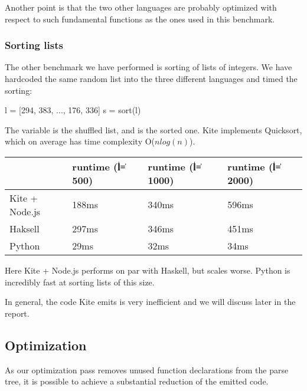 Another point is that the two other languages are probably optimized with respect to such fundamental functions as the ones used in this benchmark.

\subsubsection{Sorting lists}

The other benchmark we have performed is sorting of lists of integers. We have hardcoded the same random list into the three different languages and timed the sorting:

\begin{kite}

l = [294, 383, ..., 176, 336]
s = sort(l)
\end{kite}

The variable  is the shuffled list, and  is the sorted one. Kite implements Quicksort, which on average has time complexity O($n log(n)$).

  \begin{table}[h]
    \centering
    \begin{tabular}{|l|l|l|l|}
      \hline 
      & runtime (\|l\| = 500) & runtime (\|l\| = 1000) & runtime (\|l\| = 2000) \\

      \hline 
      Kite + Node.js & 188ms            & 340ms           & 596ms                  \\
      Haksell        & 297ms            & 346ms             & 451ms                \\
      Python         & 29ms             & 32ms             & 34ms                  \\
      \hline 
    \end{tabular}
  \end{table}

Here Kite + Node.js performs on par with Haskell, but scales worse. Python is incredibly fast at sorting lists of this size.

In general, the code Kite emits is very inefficient and we will discuss later in the report.


\subsection{Optimization}

As our optimization pass removes unused function declarations from the parse tree, it is possible to achieve a substantial reduction of the emitted code.

